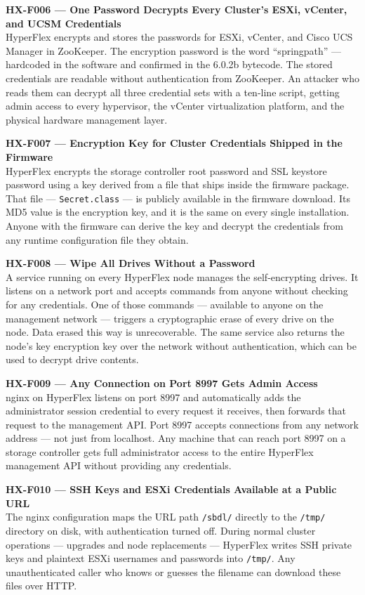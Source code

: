 \documentclass[11pt,a4paper]{article}
\begin{document}
\medskip
\textbf{HX-F006 --- One Password Decrypts Every Cluster's ESXi, vCenter, and UCSM Credentials}\\
HyperFlex encrypts and stores the passwords for ESXi, vCenter, and Cisco UCS
Manager in ZooKeeper. The encryption password is the word ``springpath'' ---
hardcoded in the software and confirmed in the 6.0.2b bytecode. The stored
credentials are readable without authentication from ZooKeeper. An attacker
who reads them can decrypt all three credential sets with a ten-line script,
getting admin access to every hypervisor, the vCenter virtualization platform,
and the physical hardware management layer.

\medskip
\textbf{HX-F007 --- Encryption Key for Cluster Credentials Shipped in the Firmware}\\
HyperFlex encrypts the storage controller root password and SSL keystore
password using a key derived from a file that ships inside the firmware package.
That file --- \texttt{Secret.class} --- is publicly available in the firmware
download. Its MD5 value is the encryption key, and it is the same on every
single installation. Anyone with the firmware can derive the key and decrypt
the credentials from any runtime configuration file they obtain.

\medskip
\textbf{HX-F008 --- Wipe All Drives Without a Password}\\
A service running on every HyperFlex node manages the self-encrypting drives.
It listens on a network port and accepts commands from anyone without checking
for any credentials. One of those commands --- available to anyone on the
management network --- triggers a cryptographic erase of every drive on the
node. Data erased this way is unrecoverable. The same service also returns the
node's key encryption key over the network without authentication, which can be
used to decrypt drive contents.

\medskip
\textbf{HX-F009 --- Any Connection on Port 8997 Gets Admin Access}\\
nginx on HyperFlex listens on port 8997 and automatically adds the administrator
session credential to every request it receives, then forwards that request to
the management API. Port 8997 accepts connections from any network address ---
not just from localhost. Any machine that can reach port 8997 on a storage
controller gets full administrator access to the entire HyperFlex management
API without providing any credentials.

\medskip
\textbf{HX-F010 --- SSH Keys and ESXi Credentials Available at a Public URL}\\
The nginx configuration maps the URL path \texttt{/sbdl/} directly to the
\texttt{/tmp/} directory on disk, with authentication turned off. During normal
cluster operations --- upgrades and node replacements --- HyperFlex writes SSH
private keys and plaintext ESXi usernames and passwords into \texttt{/tmp/}.
Any unauthenticated caller who knows or guesses the filename can download these
files over HTTP.
\end{document}
